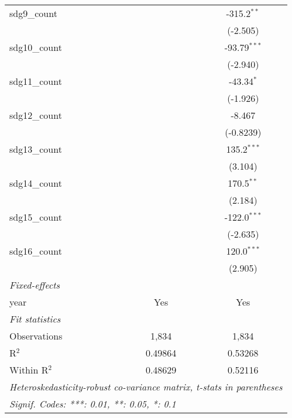 \begin{tabular}{lcc}
   sdg9\_count       &                & -315.2$^{**}$\\   
                     &                & (-2.505)\\   
   sdg10\_count      &                & -93.79$^{***}$\\   
                     &                & (-2.940)\\   
   sdg11\_count      &                & -43.34$^{*}$\\   
                     &                & (-1.926)\\   
   sdg12\_count      &                & -8.467\\   
                     &                & (-0.8239)\\   
   sdg13\_count      &                & 135.2$^{***}$\\   
                     &                & (3.104)\\   
   sdg14\_count      &                & 170.5$^{**}$\\   
                     &                & (2.184)\\   
   sdg15\_count      &                & -122.0$^{***}$\\   
                     &                & (-2.635)\\   
   sdg16\_count      &                & 120.0$^{***}$\\   
                     &                & (2.905)\\   
   \midrule
   \emph{Fixed-effects}\\
   year              & Yes            & Yes\\  
   \midrule
   \emph{Fit statistics}\\
   Observations      & 1,834          & 1,834\\  
   R$^2$             & 0.49864        & 0.53268\\  
   Within R$^2$      & 0.48629        & 0.52116\\  
   \midrule \midrule
   \multicolumn{3}{l}{\emph{Heteroskedasticity-robust co-variance matrix, t-stats in parentheses}}\\
   \multicolumn{3}{l}{\emph{Signif. Codes: ***: 0.01, **: 0.05, *: 0.1}}\\
\end{tabular}
\par\endgroup


